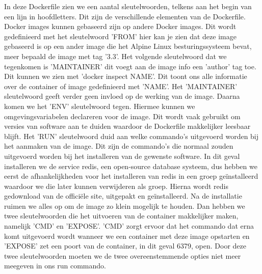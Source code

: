In deze Dockerfile zien we een aantal sleutelwoorden, telkens aan het begin van een lijn in hoofdletters. Dit zijn de verschillende elementen van de Dockerfile. Docker images kunnen gebaseerd zijn op andere Docker images. Dit wordt gedefinieerd met het sleutelwoord 'FROM' hier kan je zien dat deze image gebaseerd is op een ander image die het Alpine Linux besturingssysteem bevat, meer bepaald de image met tag '3.3'. Het volgende sleutelwoord dat we tegenkomen is 'MAINTAINER' dit voegt aan de image info een 'author' tag toe. Dit kunnen we zien met 'docker inspect NAME'. Dit toont ons alle informatie over de container of image gedefinieerd met 'NAME'. Het 'MAINTAINER' sleutelwoord geeft verder geen invloed op de werking van de image. Daarna komen we het 'ENV' sleutelwoord tegen. Hiermee kunnen we omgevingsvariabelen declareren voor de image. Dit wordt vaak gebruikt om versies van software aan te duiden waardoor de Dockerfile makkelijker leesbaar blijft. Het 'RUN' sleutelwoord duid aan welke commando's uitgevoerd worden bij het aanmaken van de image. Dit zijn de commando's die normaal zouden uitgevoerd worden bij het installeren van de gewenste software. In dit geval installeren we de service redis, een open-source database systeem, dus hebben we eerst de afhankelijkheden voor het installeren van redis in een groep geïnstalleerd waardoor we die later kunnen verwijderen als groep. Hierna wordt redis gedownload van de officiële site, uitgepakt en geïnstalleerd. Na de installatie ruimen we alles op om de image zo klein mogelijk te houden. Dan hebben we twee sleutelwoorden die het uitvoeren van de container makkelijker maken, namelijk 'CMD' en 'EXPOSE'. 'CMD' zorgt ervoor dat het commando dat erna komt uitgevoerd wordt wanneer we een container met deze image opstarten en 'EXPOSE' zet een poort van de container, in dit geval 6379, open. Door deze twee sleutelwoorden moeten we de twee overeenstemmende opties niet meer meegeven in ons run commando.

